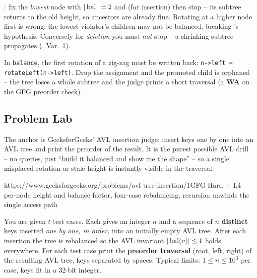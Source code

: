 \begin{warningbox}
: fix the \emph{lowest} node with $|\operatorname{bal}|=2$ and (for insertion) then stop -- its
subtree returns to the old height, so ancestors are already fine. Rotating at a higher node first is
wrong: the lowest violator's children may not be balanced, breaking 's hypothesis.
Conversely for \emph{deletion} you must \emph{not} stop -- a shrinking subtree propagates (, Var.~1).
\end{warningbox}

\begin{warningbox}
In \texttt{balance}, the first rotation of a zig-zag must be written back: \texttt{n->left =
rotateLeft(n->left)}. Drop the assignment and the promoted child is orphaned -- the tree loses a whole
subtree and the judge prints a short traversal (a \textbf{WA} on the GFG preorder check).
\end{warningbox}

\subsection{Problem Lab}

The anchor is GeeksforGeeks' AVL insertion judge: insert keys one by one into an AVL tree and print the
preorder of the result. It is the purest possible AVL drill -- no queries, just ``build it balanced and
show me the shape'' -- so a single misplaced rotation or stale height is instantly visible in the
traversal.

  {https://www.geeksforgeeks.org/problems/avl-tree-insertion/1}{GFG Hard · L4}
  {per-node height and balance factor, four-case rebalancing, recursion unwinds the single access path}

\begin{problemstatement}
You are given $t$ test cases. Each gives an integer $n$ and a sequence of $n$ \textbf{distinct} keys
inserted \emph{one by one, in order,} into an initially empty AVL tree. After each insertion the tree is
rebalanced so the AVL invariant $|\operatorname{bal}(v)|\le 1$ holds everywhere. For each test case print the
\textbf{preorder traversal} (root, left, right) of the resulting AVL tree, keys separated by spaces.
Typical limits: $1\le n\le 10^{3}$ per case, keys fit in a 32-bit integer.
\end{problemstatement}

